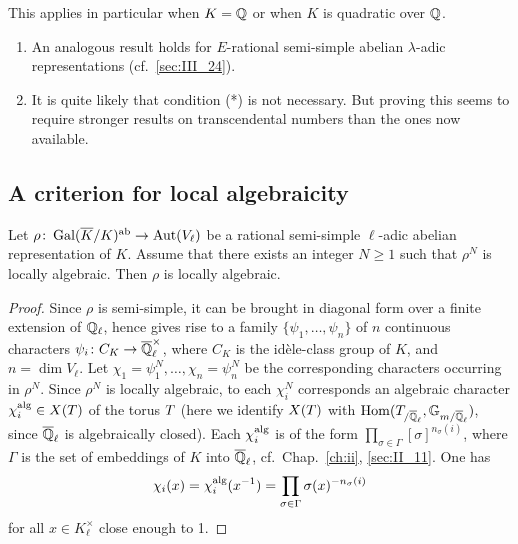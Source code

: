 This applies in particular when $K = \mathbb{Q}$ or when $K$ is quadratic over $\mathbb{Q}$.

\begin{obs}
\begin{enumerate}
	\item An analogous result holds for $E$-rational semi-simple abelian
$\lambda$-adic representations (cf.\ \ref{sec:III_24}).
	\item It is quite likely that condition (*) is not necessary. But
proving this seems to require stronger results on transcendental numbers than
the ones now available.
\end{enumerate}
\end{obs}

\subsection{A criterion for local algebraicity}
\label{sec:III_32}
\begin{prop}
	Let $\rho\colon \operatorname{Gal}(\overline{K}/K)^{\mathrm{ab}} \to \operatorname{Aut}(V_\ell)$ be a rational
	semi-simple $\ell$-adic abelian representation of $K$. Assume that
	there exists an integer $N \ge 1$ such that $\rho^N$ is locally
	algebraic. Then $\rho$ is locally algebraic.
\end{prop}
\begin{proof}
	\dpage
	Since $\rho$ is semi-simple, it can be brought in diagonal form over a
	finite extension of $\mathbb{Q}_\ell$, hence gives rise to a family $\{ \psi_1,
	\dots, \psi_n \}$ of $n$ continuous characters $\psi_i\colon C_K \to
	\overline{\mathbb{Q}}_\ell^\times$, where $C_K$ is the idèle-class group of $K$,
	and $n = \dim V_\ell$.
	Let $\chi_1 = \psi_1^N, \dots, \chi_n = \psi_n^N$ be the corresponding
	characters occurring in $\rho^N$. Since $\rho^N$ is locally algebraic,
	to each $\chi_i^N$ corresponds an algebraic character $\chi_i^{\rm alg}
	\in X(T)$ of the torus $T$ (here we identify $X(T)$ with
	$\operatorname{Hom}(T_{/\overline{\mathbb{Q}}_\ell}, \mathbb{G}_{m/\overline{\mathbb{Q}}_\ell})$, since
	$\overline{\mathbb{Q}}_\ell$ is algebraically closed). Each $\chi_i^{\rm alg}$ is of
	the form $\prod_{\sigma \in \Gamma} [\sigma]^{n_\sigma(i)}$, where
	$\Gamma$ is the set of embeddings of $K$ into $\overline{\mathbb{Q}}_\ell$, cf.\ 
	Chap.~\ref{ch:ii}, \ref{sec:II_11}. One has
	\[
		\chi_i(x) = \chi_i^{\rm alg}(x^{-1}) = \prod_{\sigma \in
		\Gamma} \sigma(x)^{-n_\sigma(i)}
	\]
	for all $x \in K_\ell^\times$ close enough to 1.
\end{proof}

